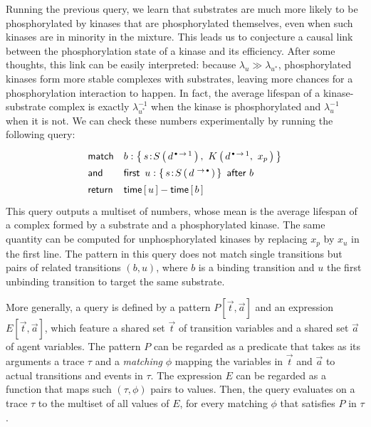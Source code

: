 \documentclass[runningheads]{llncs}
\begin{document}
Running the previous query, we learn that substrates are much more
likely to be phosphorylated by kinases that are phosphorylated
themselves, even when such kinases are in minority in the mixture.
This leads us to conjecture a causal link between the phosphorylation
state of a kinase and its efficiency. After some thoughts, this link
can be easily interpreted: because $\lambda_u \gg \lambda_{u^*}$,
phosphorylated kinases form more stable complexes with substrates,
leaving more chances for a phosphorylation interaction to happen.  In
fact, the average lifespan of a kinase-substrate complex is exactly
$\lambda_{u^*}^{-1}$ when the kinase is phosphorylated and
$\lambda_u^{-1}$ when it is not. We can check these numbers
experimentally by running the following query:
\begin{equation}\label{eq:query-lifespan}
  \Query{
    \m{match} & 
    b:\Set{ \iAG{s}{S}{d^{\Trans{\Free}{1}}}, \ 
      \AG{K}{d^{\Trans{\Free}{1}}, \ x_{p}} } \\
    \m{and} &
    \FirstAfter{u:\Set{ \iAG{s}{S}{d^{\Trans{}{\Free}}} }}{b} \\
    \m{return} & 
    \Time{u} - \Time{b}
  }
\end{equation}
This query outputs a multiset of numbers, whose mean is the average
lifespan of a complex formed by a substrate and a phosphorylated
kinase. The same quantity can be computed for unphosphorylated kinases
by replacing $x_p$ by $x_u$ in the first
line. %
The pattern in this query does not match single transitions but pairs
of related transitions $(b, u)$, where $b$ is a binding transition and
$u$ the first unbinding transition to target the same substrate.


\bigskip

More generally, a query is defined by a {pattern}
$P[\Vec{t}, \Vec{a}]$ and an {expression} $E[\Vec{t}, \Vec{a}]$, which
feature a shared set $\Vec{t}$ of transition variables and a shared
set $\Vec{a}$ of agent variables. The pattern $P$ can be regarded as a
predicate that takes as its arguments a trace $\tau$ and a
\emph{matching} $\phi$ mapping the variables in $\Vec{t}$ and
$\Vec{a}$ to actual transitions and events in $\tau$.  The expression
$E$ can be regarded as a function that maps such $(\tau, \phi)$ pairs
to values. Then, the query evaluates on a trace $\tau$ to the multiset
of all values of $E$, for every matching $\phi$ that satisfies $P$ in
$\tau$.
\end{document}
